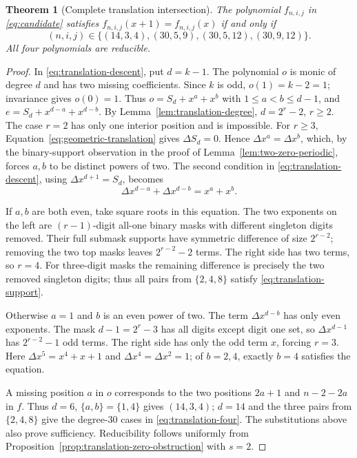 \documentclass[11pt]{article}
\newtheorem{theorem}[proposition]{Theorem}
\theoremstyle{definition}
\theoremstyle{remark}
\begin{document}
\begin{theorem}[Complete translation intersection]
\label{thm:translation-classification}
The polynomial $f_{n,i,j}$ in \eqref{eq:candidate} satisfies
$f_{n,i,j}(x+1)=f_{n,i,j}(x)$ if and only if
\begin{equation}\label{eq:translation-four}
 (n,i,j)\in\{(14,3,4),(30,5,9),(30,5,12),(30,9,12)\}.
\end{equation}
All four polynomials are reducible.
\end{theorem}
\begin{proof}
In \eqref{eq:translation-descent}, put $d=k-1$. The polynomial
$o$ is monic of degree $d$ and has two missing coefficients.
Since $k$ is odd, $o(1)=k-2=1$; invariance gives $o(0)=1$.
Thus $o=S_d+x^a+x^b$ with $1\le a<b\le d-1$, and
$e=S_d+x^{d-a}+x^{d-b}$.
By Lemma~\ref{lem:translation-degree}, $d=2^r-2$, $r\ge2$.
The case $r=2$ has only one interior position and is impossible.
For $r\ge3$, Equation~\eqref{eq:geometric-translation} gives
$\Delta S_d=0$. Hence $\Delta x^a=\Delta x^b$, which, by the
binary-support observation in the proof of
Lemma~\ref{lem:two-zero-periodic}, forces $a,b$ to be distinct
powers of two. The second condition in
\eqref{eq:translation-descent}, using $\Delta x^{d+1}=S_d$, becomes
\begin{equation}\label{eq:translation-support}
 \Delta x^{d-a}+\Delta x^{d-b}=x^a+x^b.
\end{equation}

If $a,b$ are both even, take square roots in this equation.
The two exponents on the left are $(r-1)$-digit all-one binary
masks with different singleton digits removed. Their full
submask supports have symmetric difference of size $2^{r-2}$;
removing the two top masks leaves $2^{r-2}-2$ terms.
The right side has two terms, so $r=4$.
For three-digit masks the remaining difference is precisely the
two removed singleton digits; thus all pairs from $\{2,4,8\}$
satisfy \eqref{eq:translation-support}.

Otherwise $a=1$ and $b$ is an even power of two. The term
$\Delta x^{d-b}$ has only even exponents. The mask
$d-1=2^r-3$ has all digits except digit one set, so
$\Delta x^{d-1}$ has $2^{r-2}-1$ odd terms. The right side has
only the odd term $x$, forcing $r=3$.
Here $\Delta x^5=x^4+x+1$ and $\Delta x^4=\Delta x^2=1$;
of $b=2,4$, exactly $b=4$ satisfies the equation.

A missing position $a$ in $o$ corresponds to the two positions
$2a+1$ and $n-2-2a$ in $f$. Thus $d=6$, $\{a,b\}=\{1,4\}$
gives $(14,3,4)$; $d=14$ and the three pairs from $\{2,4,8\}$
give the degree-$30$ cases in \eqref{eq:translation-four}.
The substitutions above also prove sufficiency.
Reducibility follows uniformly from
Proposition~\ref{prop:translation-zero-obstruction} with $s=2$.
\end{proof}
\end{document}
